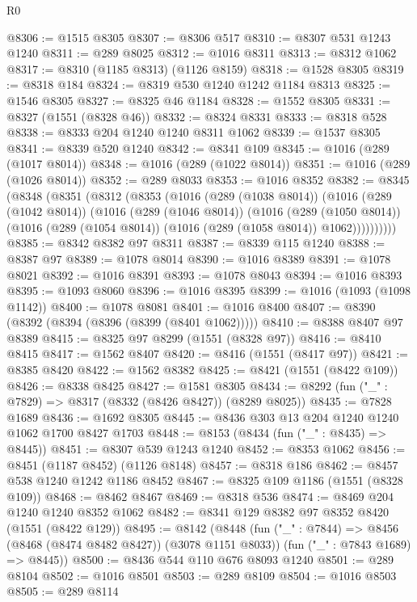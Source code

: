 \begin{lexlean}{R0}
\begin{coremodule}
@8306 := @1515 @8305
@8307 := @8306 @517
@8310 := @8307 @531 @1243 @1240
@8311 := @289 @8025
@8312 := @1016 @8311
@8313 := @8312 @1062
@8317 := @8310 (@1185 @8313) (@1126 @8159)
@8318 := @1528 @8305
@8319 := @8318 @184
@8324 := @8319 @530 @1240 @1242 @1184 @8313
@8325 := @1546 @8305
@8327 := @8325 @46 @1184
@8328 := @1552 @8305
@8331 := @8327 (@1551 (@8328 @46))
@8332 := @8324 @8331
@8333 := @8318 @528
@8338 := @8333 @204 @1240 @1240 @8311 @1062
@8339 := @1537 @8305
@8341 := @8339 @520 @1240
@8342 := @8341 @109
@8345 := @1016 (@289 (@1017 @8014))
@8348 := @1016 (@289 (@1022 @8014))
@8351 := @1016 (@289 (@1026 @8014))
@8352 := @289 @8033
@8353 := @1016 @8352
@8382 := @8345
    (@8348
      (@8351
        (@8312
          (@8353
            (@1016
              (@289 (@1038 @8014))
              (@1016
                (@289 (@1042 @8014))
                (@1016
                  (@289 (@1046 @8014))
                  (@1016
                    (@289 (@1050 @8014))
                    (@1016 (@289 (@1054 @8014)) (@1016 (@289 (@1058 @8014)) @1062))))))))))
@8385 := @8342 @8382 @97 @8311
@8387 := @8339 @115 @1240
@8388 := @8387 @97
@8389 := @1078 @8014
@8390 := @1016 @8389
@8391 := @1078 @8021
@8392 := @1016 @8391
@8393 := @1078 @8043
@8394 := @1016 @8393
@8395 := @1093 @8060
@8396 := @1016 @8395
@8399 := @1016 (@1093 (@1098 @1142))
@8400 := @1078 @8081
@8401 := @1016 @8400
@8407 := @8390 (@8392 (@8394 (@8396 (@8399 (@8401 @1062)))))
@8410 := @8388 @8407 @97 @8389
@8415 := @8325 @97 @8299 (@1551 (@8328 @97))
@8416 := @8410 @8415
@8417 := @1562 @8407
@8420 := @8416 (@1551 (@8417 @97))
@8421 := @8385 @8420
@8422 := @1562 @8382
@8425 := @8421 (@1551 (@8422 @109))
@8426 := @8338 @8425
@8427 := @1581 @8305
@8434 := @8292 (fun ("_" : @7829) => @8317 (@8332 (@8426 @8427)) (@8289 @8025))
@8435 := @7828 @1689
@8436 := @1692 @8305
@8445 := @8436 @303 @13 @204 @1240 @1240 @1062 @1700 @8427 @1703
@8448 := @8153 (@8434 (fun ("_" : @8435) => @8445))
@8451 := @8307 @539 @1243 @1240
@8452 := @8353 @1062
@8456 := @8451 (@1187 @8452) (@1126 @8148)
@8457 := @8318 @186
@8462 := @8457 @538 @1240 @1242 @1186 @8452
@8467 := @8325 @109 @1186 (@1551 (@8328 @109))
@8468 := @8462 @8467
@8469 := @8318 @536
@8474 := @8469 @204 @1240 @1240 @8352 @1062
@8482 := @8341 @129 @8382 @97 @8352 @8420 (@1551 (@8422 @129))
@8495 := @8142
    (@8448
      (fun ("_" : @7844) => @8456 (@8468 (@8474 @8482 @8427)) (@3078 @1151 @8033))
      (fun ("_" : @7843 @1689) => @8445))
@8500 := @8436 @544 @110 @676 @8093 @1240
@8501 := @289 @8104
@8502 := @1016 @8501
@8503 := @289 @8109
@8504 := @1016 @8503
@8505 := @289 @8114

\end{coremodule}
\end{lexlean}
